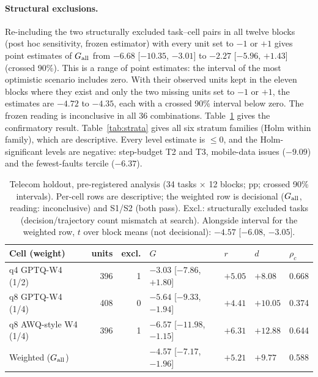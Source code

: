 \paragraph{Structural exclusions.} Re-including the two structurally excluded task--cell pairs in all twelve blocks (post hoc sensitivity, frozen estimator) with every unit set to $-1$ or $+1$ gives point estimates of $G_{\mathrm{all}}$ from $-6.68$ [$-10.35$, $-3.01$] to $-2.27$ [$-5.96$, $+1.43$]\pp{} (crossed 90\%). This is a range of point estimates: the interval of the most optimistic scenario includes zero. With their observed units kept in the eleven blocks where they exist and only the two missing units set to $-1$ or $+1$, the estimates are $-4.72$ to $-4.35$\pp{}, each with a crossed 90\% interval below zero. The frozen reading is inconclusive in all 36 combinations. %
Table~\ref{tab:holdout} gives the confirmatory result. Table~\ref{tab:strata} gives all six stratum families (Holm within family), which are descriptive. Every level estimate is $\le 0$, and the Holm-significant levels are negative: step-budget T2 and T3, mobile-data issues ($-9.09$\pp{}) and the fewest-faults tercile ($-6.37$\pp{}). %
\begin{table}[t]
\centering%
\renewcommand{\arraystretch}{1.12}\fontsize{8.5}{10}\selectfont\setlength{\tabcolsep}{4pt}
\begin{tabular}{@{}lrrllll@{}}
\toprule
Cell (weight) & units & excl. & $G$ & $r$ & $d$ & $\rho_c$ \\
\midrule
q4 GPTQ-W4 (1/2) & 396 & 1 & $-3.03$ [$-7.86$, $+1.80$] & $+5.05$ & $+8.08$ & 0.668 \\
q8 GPTQ-W4 (1/4) & 408 & 0 & $-5.64$ [$-9.33$, $-1.94$] & $+4.41$ & $+10.05$ & 0.374 \\
q8 AWQ-style W4 (1/4) & 396 & 1 & $-6.57$ [$-11.98$, $-1.15$] & $+6.31$ & $+12.88$ & 0.644 \\
\midrule
Weighted ($G_{\mathrm{all}}$) & & & $-4.57$ [$-7.17$, $-1.96$] & $+5.21$ & $+9.77$ & 0.588 \\
\bottomrule
\end{tabular}
\caption{Telecom holdout, pre-registered analysis (34 tasks $\times$ 12 blocks; pp; crossed 90\% intervals). Per-cell rows are descriptive; the weighted row is decisional ($G_{\mathrm{all}}$, reading: inconclusive) and S1/S2 (both pass). Excl.: structurally excluded tasks (decision/trajectory count mismatch at search). Alongside interval for the weighted row, $t$ over block means (not decisional): $-4.57$ [$-6.08$, $-3.05$].} %
\label{tab:holdout}
\end{table}

